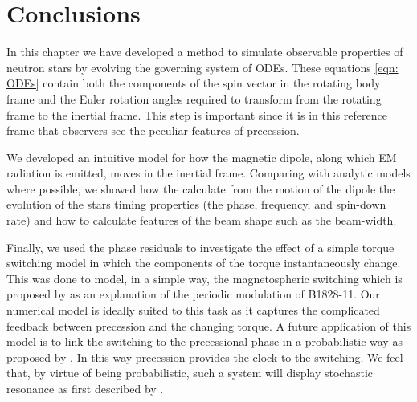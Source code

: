 \documentclass[../full_thesis/full_thesis.tex]{subfiles}
\begin{document}
\section{Conclusions}

In this chapter we have developed a method to simulate observable properties of
neutron stars by evolving the governing system of ODEs. These equations
\eqref{eqn: ODEs} contain both the components of the spin vector in the rotating
body frame and the Euler rotation angles required to transform from
the rotating frame to the inertial frame. This step is important since it is in
this reference frame that observers see the peculiar features of precession.

We developed an intuitive model for how the magnetic dipole, along which EM
radiation is emitted, moves in the inertial frame. Comparing with analytic
models where possible, we showed how the calculate from the motion of the
dipole the evolution of the stars timing properties (the phase, frequency, and
spin-down rate) and how to calculate features of the beam shape such as the
beam-width.

Finally, we used the phase residuals to investigate the effect of a simple torque
switching model in which the components of the torque instantaneously change.
This was done to model, in a simple way, the magnetospheric switching which is
proposed by \citet{Lyne2010} as an explanation of the periodic modulation of
B1828-11. Our numerical model is ideally suited to this task as it captures the
complicated feedback between precession and the changing torque.
A future application of this model is to link the switching to the precessional
phase in a probabilistic way as proposed by \citet{Jones2012}. In this way
precession provides the clock to the switching. We feel that, by virtue of
being probabilistic, such a system will display stochastic resonance as first
described by \citet{Cordes2013}.

\biblio
\end{document}
